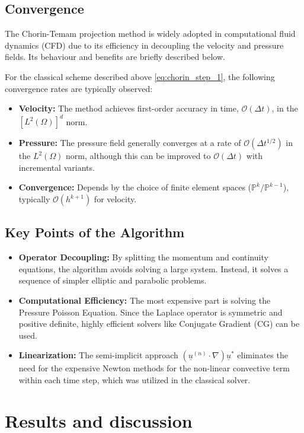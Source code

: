 \documentclass[11pt,a4paper]{article}
\renewcommand{\vec}[1]{\underline{#1}} %
\begin{document}
\subsection{Convergence}
The Chorin-Temam projection method is widely adopted in computational fluid dynamics (CFD) due to its efficiency in decoupling the velocity and pressure fields. Its behaviour and benefits are briefly described below.

For the classical scheme described above \eqref{eq:chorin_step_1}, the following convergence rates are typically observed:
\begin{itemize}
    \item \textbf{Velocity:} The method achieves first-order accuracy in time, $\mathcal{O}(\Delta t)$, in the $[L^2(\Omega)]^d$ norm.
    \item \textbf{Pressure:} The pressure field generally converges at a rate of $\mathcal{O}(\Delta t^{1/2})$ in the $L^2(\Omega)$ norm, although this can be improved to $\mathcal{O}(\Delta t)$ with incremental variants.
    \item \textbf{Convergence:} Depends by the choice of finite element spaces ($\mathbb{P}^k/\mathbb{P}^{k-1}$), typically $\mathcal{O}(h^{k+1})$ for velocity.
\end{itemize}

\subsection*{Key Points of the Algorithm}
\begin{itemize}
    \item \textbf{Operator Decoupling:} By splitting the momentum and continuity equations, the algorithm avoids solving a large system. Instead, it solves a sequence of simpler elliptic and parabolic problems.
    \item \textbf{Computational Efficiency:} The most expensive part is solving the Pressure Poisson Equation. Since the Laplace operator is symmetric and positive definite, highly efficient solvers like Conjugate Gradient (CG) can be used.
    \item \textbf{Linearization:} The semi-implicit approach $(\vec{u}^{(n)} \cdot \nabla)\vec{u}^*$ eliminates the need for the expensive Newton methods for the non-linear convective term within each time step, which was utilized in the classical solver.
\end{itemize}

\section{Results and discussion}
\end{document}
